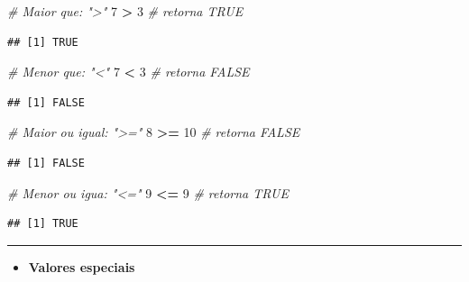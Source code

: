 \documentclass[
]{book}
\newenvironment{Shaded}{\begin{snugshade}}{\end{snugshade}}
\newcommand{\CommentTok}[1]{\textcolor[rgb]{0.56,0.35,0.01}{\textit{#1}}}
\newcommand{\DecValTok}[1]{\textcolor[rgb]{0.00,0.00,0.81}{#1}}
\newcommand{\SpecialCharTok}[1]{\textcolor[rgb]{0.81,0.36,0.00}{\textbf{#1}}}
\providecommand{\tightlist}{%
  \setlength{\itemsep}{0pt}\setlength{\parskip}{0pt}}
\begin{document}
\begin{Shaded}
\begin{Highlighting}[]
\CommentTok{\# Maior que: "\textgreater{}"}
\DecValTok{7} \SpecialCharTok{\textgreater{}} \DecValTok{3} \CommentTok{\# retorna TRUE}
\end{Highlighting}
\end{Shaded}

\begin{verbatim}
## [1] TRUE
\end{verbatim}

\begin{Shaded}
\begin{Highlighting}[]
\CommentTok{\# Menor que: "\textless{}"}
\DecValTok{7} \SpecialCharTok{\textless{}} \DecValTok{3} \CommentTok{\# retorna FALSE}
\end{Highlighting}
\end{Shaded}

\begin{verbatim}
## [1] FALSE
\end{verbatim}

\begin{Shaded}
\begin{Highlighting}[]
\CommentTok{\# Maior ou igual: "\textgreater{}="}
\DecValTok{8} \SpecialCharTok{\textgreater{}=} \DecValTok{10} \CommentTok{\# retorna FALSE}
\end{Highlighting}
\end{Shaded}

\begin{verbatim}
## [1] FALSE
\end{verbatim}

\begin{Shaded}
\begin{Highlighting}[]
\CommentTok{\# Menor ou igua: "\textless{}="}
\DecValTok{9} \SpecialCharTok{\textless{}=} \DecValTok{9} \CommentTok{\# retorna TRUE}
\end{Highlighting}
\end{Shaded}

\begin{verbatim}
## [1] TRUE
\end{verbatim}

\begin{center}\rule{0.5\linewidth}{0.5pt}\end{center}

\begin{itemize}
\tightlist
\item
  \textbf{Valores especiais}
\end{itemize}
\end{document}
